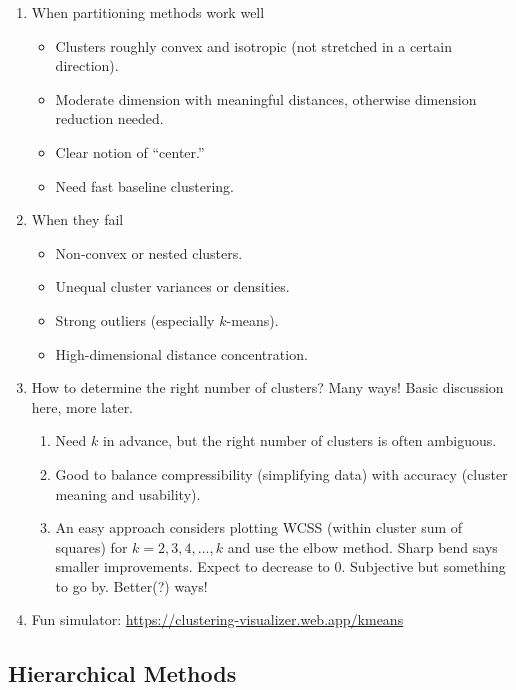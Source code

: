 \documentclass{article}
\begin{document}
\begin{enumerate}
\item When partitioning methods work well
\begin{itemize}
\item Clusters roughly convex and isotropic (not stretched in a certain direction).
\item Moderate dimension with meaningful distances, otherwise dimension reduction needed.
\item Clear notion of “center.”
\item Need fast baseline clustering.
\end{itemize}

\item When they fail
\begin{itemize}
\item Non-convex or nested clusters.
\item Unequal cluster variances or densities.
\item Strong outliers (especially $k$-means).
\item High-dimensional distance concentration.
\end{itemize}

\item How to determine the right number of clusters? Many ways! Basic discussion here, more later.
\begin{enumerate}
\item Need $k$ in advance, but the right number of clusters is often ambiguous.
\item Good to balance compressibility (simplifying data) with accuracy (cluster meaning and usability).
\item An easy approach considers plotting WCSS (within cluster sum of squares) for $k=2,3,4,\dots,k$ and use the elbow method. Sharp bend says smaller improvements. Expect to decrease to 0. Subjective but something to go by.  Better(?) ways!
\end{enumerate}

\item Fun simulator: \url{https://clustering-visualizer.web.app/kmeans}

\end{enumerate}


\subsection*{Hierarchical Methods}
\end{document}

